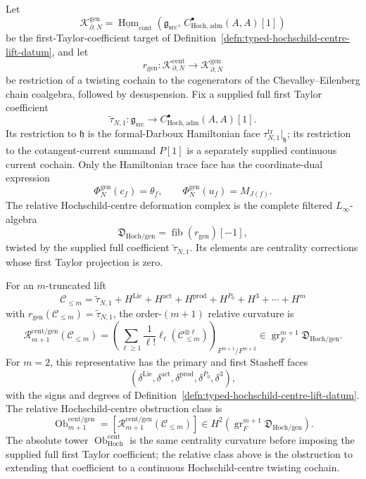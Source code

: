 \begin{defn}
\label{defn:relative-hochschild-centre-extension-obstruction}
Let
\[
  \mathcal K^{\mathrm{gen}}_{\partial,N}
  =
  \underline{\operatorname{Hom}}_{\mathrm{cont}}\!\left(
    \mathfrak g_{\mathrm{src}},\,
    C^\bullet_{\mathrm{Hoch},\mathrm{adm}}(A,A)[1]\right)
\]
be the first-Taylor-coefficient target of
Definition~\ref{defn:typed-hochschild-centre-lift-datum}, and let
\[
  r_{\mathrm{gen}}\colon
  \mathcal K^{\mathrm{cent}}_{\partial,N}
  \longrightarrow
  \mathcal K^{\mathrm{gen}}_{\partial,N}
\]
be restriction of a twisting cochain to the cogenerators of the
Chevalley--Eilenberg chain coalgebra, followed by desuspension.  Fix a
supplied full first Taylor coefficient
\[
  \widetilde\tau_{N,1}\colon
  \mathfrak g_{\mathrm{src}}\longrightarrow
  C^\bullet_{\mathrm{Hoch},\mathrm{adm}}(A,A)[1].
\]
Its restriction to \(\mathfrak h\) is the formal-Darboux Hamiltonian
face \(\tau^{\mathrm{tr}}_{N,1}|_{\mathfrak h}\); its restriction to
the cotangent-current summand \(P[1]\) is a separately supplied
continuous current cochain.  Only the Hamiltonian trace face has the
coordinate-dual expression
\[
  \Phi_N^{\mathrm{gen}}(c_f)=\theta_f,\qquad
  \Phi_N^{\mathrm{gen}}(u_f)=M_{J(f)} .
\]
The relative Hochschild-centre deformation complex is the complete
filtered \(L_\infty\)-algebra
\[
  \mathfrak D_{\mathrm{Hoch}/\mathrm{gen}}
  =
  \operatorname{fib}(r_{\mathrm{gen}})[-1],
\]
twisted by the supplied full coefficient \(\widetilde\tau_{N,1}\).
Its elements are centrality
corrections whose first Taylor projection is zero.

For an \(m\)-truncated lift
\[
  \mathcal C_{\le m}
  =
  \widetilde\tau_{N,1}
  +H^{\mathrm{Lie}}+H^{\mathrm{act}}
  +H^{\mathrm{prod}}+H^{P_0}+H^3+\cdots+H^m
\]
with
\(r_{\mathrm{gen}}(\mathcal C_{\le m})=\widetilde\tau_{N,1}\),
the order-\((m+1)\) relative curvature is
\[
  \mathcal R^{\mathrm{cent}/\mathrm{gen}}_{m+1}
  (\mathcal C_{\le m})
  =
  \left(
  \sum_{\ell\ge1}\frac1{\ell!}
  \ell_\ell(\mathcal C_{\le m}^{\otimes\ell})
  \right)_{F^{m+1}/F^{m+2}}
  \in
  \operatorname{gr}^{m+1}_{F}
  \mathfrak D_{\mathrm{Hoch}/\mathrm{gen}} .
\]
For \(m=2\), this representative has the primary and first Stasheff
faces
\[
  (\delta^{\mathrm{Lie}},\delta^{\mathrm{act}},
    \delta^{\mathrm{prod}},\delta^{P_0},\delta^3),
\]
with the signs and degrees of
Definition~\ref{defn:typed-hochschild-centre-lift-datum}.  The relative
Hochschild-centre obstruction class is
\[
  \operatorname{Ob}^{\mathrm{cent}/\mathrm{gen}}_{m+1}
  =
  \left[
  \mathcal R^{\mathrm{cent}/\mathrm{gen}}_{m+1}
  (\mathcal C_{\le m})
  \right]
  \in
  H^2\!\left(
    \operatorname{gr}^{m+1}_{F}
    \mathfrak D_{\mathrm{Hoch}/\mathrm{gen}}\right).
\]
The absolute tower
\(\operatorname{Ob}^{\mathrm{cent}}_{\mathrm{Hoch}}\) is the same
centrality curvature before imposing the supplied full first Taylor
coefficient; the relative class above is the obstruction to extending
that coefficient to a continuous Hochschild-centre twisting cochain.
\end{defn}

